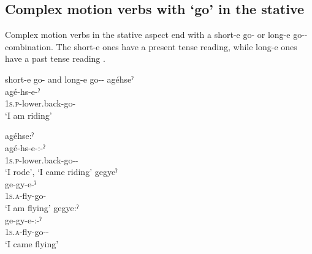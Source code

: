 \subsection{Complex motion verbs with  ‘go’ in the stative} \label{ch:Complex motion verbs in the stative aspect}
Complex motion verbs in the stative aspect end with a short-e  go-{\stative} or long-e  go-{\purposive}-{\stative} combination. The short-e ones have a present tense reading, while long-e ones have a past tense reading .

\ea\label{ex:complmotex4} short-e  go-{\stative} and long-e  go-{\purposive}-{\stative}
\ea 
\ea agéhseˀ\\
\gll agé-hs-e-ˀ\\
 \textsc{1s.p}-lower.back-go-{\stative} \\
\glt `I am riding'

  \ex agéhse:ˀ\\
    \gll agé-hs-e-:-ˀ\\
    \textsc{1s.p}-lower.back-go-{\purposive}-{\stative}\\
    \glt ‘I rode’, ‘I came riding’
\z
\ex 
\ea gegyeˀ\\
\gll ge-gy-e-ˀ\\
 \textsc{1s.a}-fly-go-{\stative}\\
\glt `I am flying'
\ex gegye:ˀ\\
    \gll ge-gy-e-:-ˀ\\
    \textsc{1s.a}-fly-go-{\purposive}-{\stative}\\
    \glt ‘I came flying’
\z

